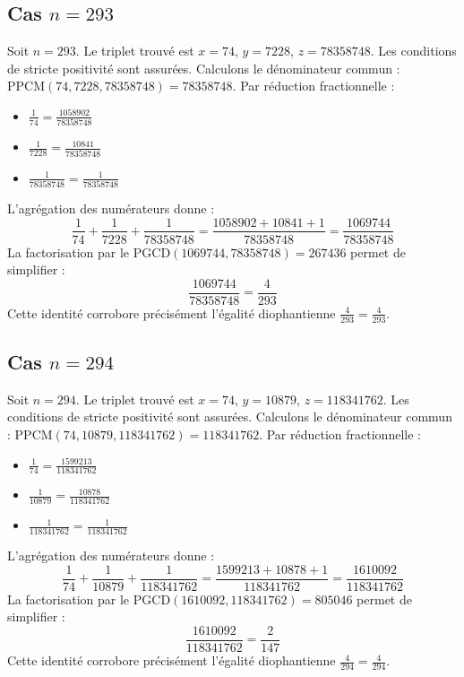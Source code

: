 \documentclass[11pt,a4paper]{article}
\begin{document}
\subsection{Cas $n = 293$}
Soit $n = 293$. Le triplet trouvé est $x = 74$, $y = 7228$, $z = 78358748$.
Les conditions de stricte positivité sont assurées.
Calculons le dénominateur commun : $\text{PPCM}(74, 7228, 78358748) = 78358748$.
Par réduction fractionnelle :
\begin{itemize}
    \item $\frac{1}{74} = \frac{1058902}{78358748}$
    \item $\frac{1}{7228} = \frac{10841}{78358748}$
    \item $\frac{1}{78358748} = \frac{1}{78358748}$
\end{itemize}
L'agrégation des numérateurs donne :
$$ \frac{1}{74} + \frac{1}{7228} + \frac{1}{78358748} = \frac{1058902 + 10841 + 1}{78358748} = \frac{1069744}{78358748} $$
La factorisation par le $\text{PGCD}(1069744, 78358748) = 267436$ permet de simplifier :
$$ \frac{1069744}{78358748} = \frac{4}{293} $$
Cette identité corrobore précisément l'égalité diophantienne $\frac{4}{293} = \frac{4}{293}$.

\subsection{Cas $n = 294$}
Soit $n = 294$. Le triplet trouvé est $x = 74$, $y = 10879$, $z = 118341762$.
Les conditions de stricte positivité sont assurées.
Calculons le dénominateur commun : $\text{PPCM}(74, 10879, 118341762) = 118341762$.
Par réduction fractionnelle :
\begin{itemize}
    \item $\frac{1}{74} = \frac{1599213}{118341762}$
    \item $\frac{1}{10879} = \frac{10878}{118341762}$
    \item $\frac{1}{118341762} = \frac{1}{118341762}$
\end{itemize}
L'agrégation des numérateurs donne :
$$ \frac{1}{74} + \frac{1}{10879} + \frac{1}{118341762} = \frac{1599213 + 10878 + 1}{118341762} = \frac{1610092}{118341762} $$
La factorisation par le $\text{PGCD}(1610092, 118341762) = 805046$ permet de simplifier :
$$ \frac{1610092}{118341762} = \frac{2}{147} $$
Cette identité corrobore précisément l'égalité diophantienne $\frac{4}{294} = \frac{4}{294}$.
\end{document}
